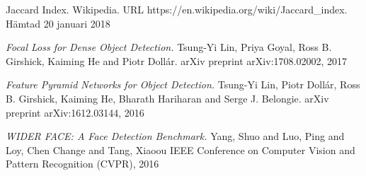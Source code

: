 \documentclass[a4paper,11pt,twoside]{article}
\begin{document}
\begin{thebibliography}{99}
	Jaccard Index. Wikipedia.
    URL https://en.wikipedia.org/wiki/Jaccard{\_}index. 
    Hämtad 20 januari 2018
    
	\textit{Focal Loss for Dense Object Detection.}
	Tsung{-}Yi Lin,
    Priya Goyal,
    Ross B. Girshick,
    Kaiming He and
    Piotr Doll{\'{a}}r.
    arXiv preprint arXiv:1708.02002, 2017

	\textit{Feature Pyramid Networks for Object Detection.}
	Tsung{-}Yi Lin,
               Piotr Doll{\'{a}}r,
               Ross B. Girshick,
               Kaiming He,
               Bharath Hariharan and
               Serge J. Belongie.
    arXiv preprint arXiv:1612.03144, 2016
    
	\textit{WIDER FACE: A Face Detection Benchmark.}
	Yang, Shuo and Luo, Ping and Loy, Chen Change and Tang, Xiaoou
    IEEE Conference on Computer Vision and Pattern Recognition (CVPR), 2016

\end{thebibliography}
\end{document}
